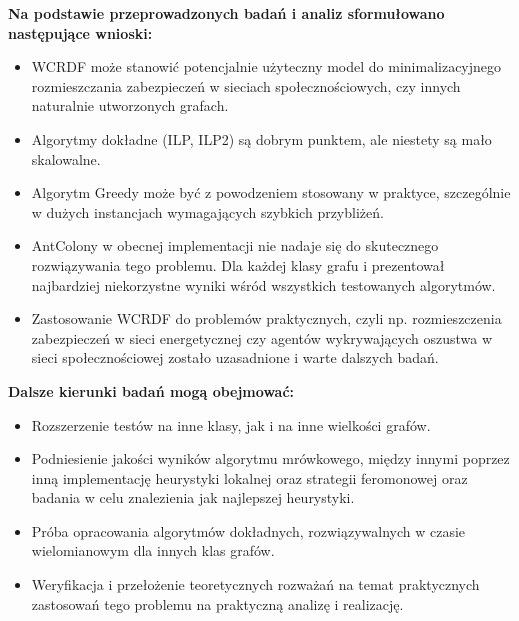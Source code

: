 \textbf{Na podstawie przeprowadzonych badań i analiz sformułowano następujące wnioski:}
\begin{itemize}
    \item WCRDF może stanowić potencjalnie użyteczny model do minimalizacyjnego rozmieszczania zabezpieczeń w sieciach społecznościowych, czy innych naturalnie utworzonych grafach.
    \item Algorytmy dokładne (ILP, ILP2) są dobrym punktem, ale niestety są mało skalowalne.
    \item Algorytm Greedy może być z powodzeniem stosowany w praktyce, szczególnie w dużych instancjach wymagających szybkich przybliżeń.
    \item AntColony w obecnej implementacji nie nadaje się do skutecznego rozwiązywania tego problemu. Dla każdej klasy grafu i prezentował najbardziej niekorzystne wyniki wśród wszystkich testowanych algorytmów.
    \item Zastosowanie WCRDF do problemów praktycznych, czyli np. rozmieszczenia zabezpieczeń w sieci energetycznej czy agentów wykrywających oszustwa w sieci społecznościowej zostało uzasadnione i warte dalszych badań.
\end{itemize}

\textbf{Dalsze kierunki badań mogą obejmować:}
\begin{itemize}
    \item Rozszerzenie testów na inne klasy, jak i na inne wielkości grafów.
    \item Podniesienie jakości wyników algorytmu mrówkowego, między innymi poprzez inną implementację heurystyki lokalnej oraz strategii feromonowej oraz badania w celu znalezienia jak najlepszej heurystyki.
    \item Próba opracowania algorytmów dokładnych, rozwiązywalnych w czasie wielomianowym dla innych klas grafów.
    \item Weryfikacja i przełożenie teoretycznych rozważań na temat praktycznych zastosowań tego problemu na praktyczną analizę i realizację.
\end{itemize}
